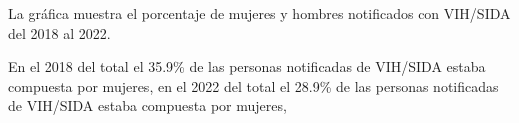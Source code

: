 La gráfica muestra el porcentaje de mujeres y hombres notificados con VIH/SIDA del 2018 al 2022. 

En el 2018 del total el 35.9\% de las personas notificadas de VIH/SIDA estaba compuesta por mujeres, en el 2022 del total el 28.9\% de las personas notificadas de VIH/SIDA estaba compuesta por mujeres,